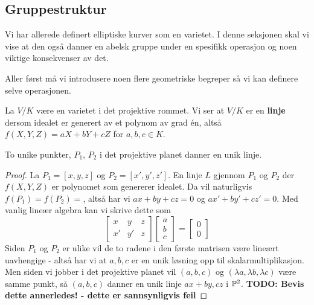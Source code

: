 \subsection{Gruppestruktur}
Vi har allerede definert elliptiske kurver som en varietet. I denne seksjonen skal vi vise at den også danner en abelsk gruppe under en spesifikk operasjon og noen viktige konsekvenser av det.

Aller først må vi introdusere noen flere geometriske begreper så vi kan definere selve operasjonen.

\begin{definisjon}
La $V/K$ være en varietet i det projektive rommet. Vi ser at $V/K$ er en \textbf{linje} dersom idealet er generert av et polynom av grad én, altså $f(X,Y,Z) = aX + bY + cZ$ for $a,b,c \in K$.
\end{definisjon}

\begin{proposisjon}
To unike punkter, $P_1$, $P_2$ i det projektive planet danner en unik linje. 
\begin{proof}
La $P_1 = [x,y,z]$ og $P_2 = [x', y', z']$. En linje $L$ gjennom $P_1$ og $P_2$ der $f(X,Y,Z)$ er polynomet som genererer idealet. Da vil naturligvis $f(P_1) = f(P_2) = $, altså har vi $ax + by + cz = 0$ og $ax' + by' + cz' = 0$. Med vanlig lineær algebra kan vi skrive dette som 
\begin{equation*}
\begin{bmatrix}
x & y & z \\
x' & y' & z
\end{bmatrix}
\begin{bmatrix}
a \\
b \\
c
\end{bmatrix}
= 
\begin{bmatrix}
0 \\
0
\end{bmatrix}
\end{equation*}
Siden $P_1$ og $P_2$ er ulike vil de to radene i den første matrisen være lineært uavhengige - altså har vi at $a,b,c$ er en unik løsning opp til skalarmultiplikasjon. Men siden vi jobber i det projektive planet vil $(a,b,c)$ og $(\lambda a, \lambda b, \lambda c)$ være samme punkt, så $(a,b,c)$ danner en unik linje $ax + by, cz$ i $\mathbb{P}^2$. 
\textbf{TODO: Bevis dette annerledes! - dette er sannsynligvis feil}
\end{proof}
\end{proposisjon}

